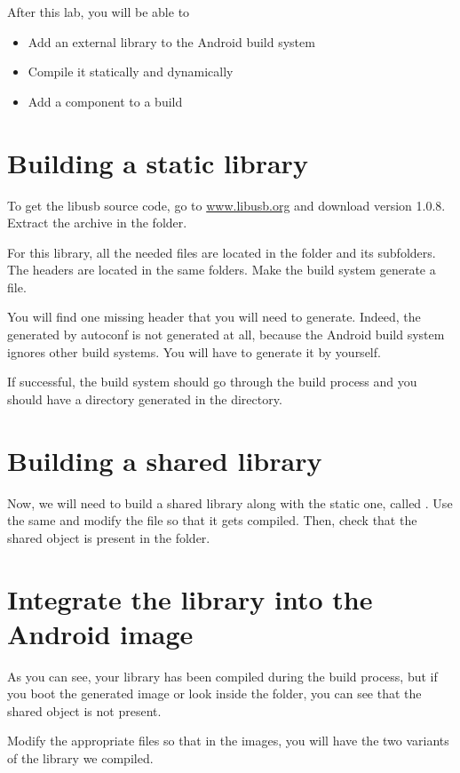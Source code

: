 
After this lab, you will be able to
\begin{itemize}
  \item Add an external library to the Android build system
  \item Compile it statically and dynamically
  \item Add a component to a build
\end{itemize}

\section{Building a static library}

To get the libusb source code, go to \url{www.libusb.org} and download
version 1.0.8. Extract the archive in the  folder.

For this library, all the needed  files are located in the 
folder and its subfolders. The headers are located in the same folders. Make
the build system generate a  file.

You will find one missing header that you will need to generate. Indeed, the
 generated by autoconf is not generated at all, because the
Android build system ignores other build systems. You will have to generate it
by yourself.

If successful, the build system should go through the build process and you
should have a directory generated in the  directory.

\section{Building a shared library}

Now, we will need to build a shared library along with the static one, called
. Use the same  and modify the 
file so that it gets compiled. Then, check that the shared object is present in
the  folder.

\section{Integrate the library into the Android image}

As you can see, your library has been compiled during the build process, but if
you boot the generated image or look inside the 
folder, you can see that the shared object is not present.

Modify the appropriate files so that in the images, you will have the two 
variants of the library we compiled.
